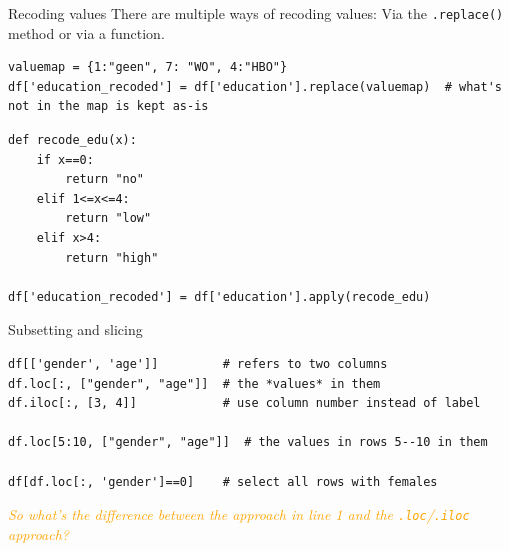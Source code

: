 \begin{frame}[fragile]{Recoding values}
There are multiple ways of recoding values: Via the \texttt{.replace()} method or via a function.

\begin{verbatim}
valuemap = {1:"geen", 7: "WO", 4:"HBO"}
df['education_recoded'] = df['education'].replace(valuemap)  # what's not in the map is kept as-is
\end{verbatim}


\begin{verbatim}
def recode_edu(x):
    if x==0:
        return "no"
    elif 1<=x<=4:
        return "low"
    elif x>4:
        return "high"
    
df['education_recoded'] = df['education'].apply(recode_edu)
\end{verbatim}



\end{frame}





\begin{frame}[fragile]{Subsetting and slicing}
\begin{verbatim}
df[['gender', 'age']]         # refers to two columns
df.loc[:, ["gender", "age"]]  # the *values* in them
df.iloc[:, [3, 4]]            # use column number instead of label

df.loc[5:10, ["gender", "age"]]  # the values in rows 5--10 in them

df[df.loc[:, 'gender']==0]    # select all rows with females
\end{verbatim}    
\pause

\emph{\textcolor{orange}{So what's the difference between the approach in line 1 and the \texttt{.loc}/\texttt{.iloc} approach?}}
\end{frame}



